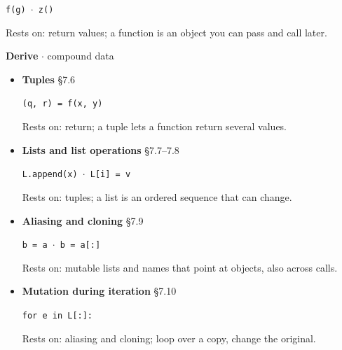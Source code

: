 \documentclass[11pt]{article}
\begin{document}
\begin{keepsection}
\begin{itemize}
\texttt{f(g) \ensuremath{\cdot} z()}

Rests on: return values; a function is an object you can pass and call later.
\end{itemize}

\textbf{Derive} \ensuremath{\cdot} compound data

\begin{itemize}
\item {}
\textbf{Tuples} \hfill{\small\color{FAUblue}§7.6}

\texttt{(q, r) = f(x, y)}

Rests on: return; a tuple lets a function return several values.
\item {}
\textbf{Lists and list operations} \hfill{\small\color{FAUblue}§7.7–7.8}

\texttt{L.append(x) \ensuremath{\cdot} L[i] = v}

Rests on: tuples; a list is an ordered sequence that can change.
\item {}
\textbf{Aliasing and cloning} \hfill{\small\color{FAUblue}§7.9}

\texttt{b = a \ensuremath{\cdot} b = a[:]}

Rests on: mutable lists and names that point at objects, also across calls.
\item {}
\textbf{Mutation during iteration} \hfill{\small\color{FAUblue}§7.10}

\texttt{for e in L[:]:}

Rests on: aliasing and cloning; loop over a copy, change the original.
\end{itemize}


\end{keepsection}
\end{document}
